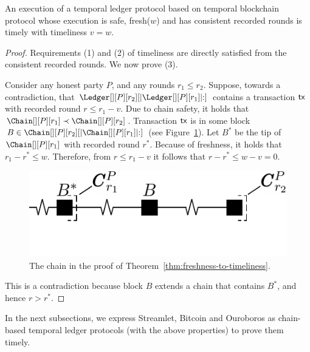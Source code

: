 \begin{theorem} \label{thm:freshness-to-timeliness}
  An execution of a temporal ledger protocol based on
  temporal blockchain protocol
  whose execution is safe, fresh($w$) and has consistent recorded rounds is timely with timeliness $v = w$.
\end{theorem}
\begin{proof}
  Requirements (1) and (2) of timeliness are directly satisfied from
  the consistent recorded rounds.
  We now prove (3).

  Consider any honest party $P$, and any rounds $r_1 \leq r_2$.
  Suppose, towards a contradiction, that $\Ledger[][P][r_2][|\Ledger[][P][r_1]|{:}]$
  contains a transaction $\textsf{tx}$ with recorded round $r \leq r_1 - v$.
  Due to chain safety, it holds that $\Chain[][P][r_1] \prec \Chain[][P][r_2]$.
  Transaction $\textsf{tx}$ is in some block $B \in \Chain[][P][r_2][|\Chain[][P][r_1]|{:}]$
  (see Figure~\ref{fig:freshness-to-timeliness}).
  Let $B^*$ be the tip of $\Chain[][P][r_1]$ with recorded round $r^*$.
  Because of freshness, it holds that $r_1 - r^* \leq w$.
  Therefore, from $r \leq r_1 - v$ it follows that $r - r^* \leq w - v = 0$.

  \begin{figure}
    \centering
    \includegraphics[width=0.5\columnwidth,keepaspectratio]{figures/freshness-timeliness.pdf}
    \caption{The chain in the proof of Theorem~\ref{thm:freshness-to-timeliness}.}
    \label{fig:freshness-to-timeliness}
  \end{figure}

  This is a contradiction because block $B$ extends a chain that contains $B^*$,
  and hence $r > r^*$.
  \Qed
\end{proof}

In the next subsections, we express Streamlet, Bitcoin and Ouroboros
as chain-based temporal ledger protocols (with the above properties) to
prove them timely.
